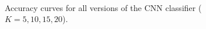 \documentclass[letterpaper, 10 pt, conference]{IEEEtran}
\begin{document}
\begin{figure}[t]
     \centering
     \\
        \caption{Accuracy curves for all versions of the CNN classifier ($K=5,10,15,20$).}
        \label{fig:acc_comparison}
\end{figure}
\end{document}
